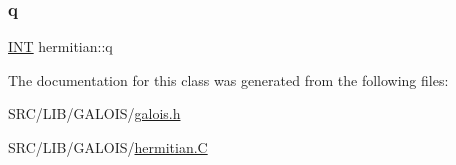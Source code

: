 \mbox{\label{classhermitian_a23b35d788da02fe4d49b4bae2d193760}} 
\subsubsection{\texorpdfstring{q}{q}}
{\footnotesize\ttfamily \mbox{\hyperlink{galois_8h_a09fddde158a3a20bd2dcadb609de11dc}{I\+NT}} hermitian\+::q}



The documentation for this class was generated from the following files\+:\begin{DoxyCompactItemize}
\item 
S\+R\+C/\+L\+I\+B/\+G\+A\+L\+O\+I\+S/\mbox{\hyperlink{galois_8h}{galois.\+h}}\item 
S\+R\+C/\+L\+I\+B/\+G\+A\+L\+O\+I\+S/\mbox{\hyperlink{hermitian_8_c}{hermitian.\+C}}\end{DoxyCompactItemize}
